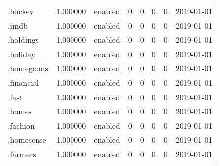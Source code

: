 \begin{tabular}{lrlrrrrl}
.hockey                   &          1.000000 &         enabled &                           0 &                           0 &                           0 &                   0 &           2019-01-01 \\
.imdb                     &          1.000000 &         enabled &                           0 &                           0 &                           0 &                   0 &           2019-01-01 \\
.holdings                 &          1.000000 &         enabled &                           0 &                           0 &                           0 &                   0 &           2019-01-01 \\
.holiday                  &          1.000000 &         enabled &                           0 &                           0 &                           0 &                   0 &           2019-01-01 \\
.homegoods                &          1.000000 &         enabled &                           0 &                           0 &                           0 &                   0 &           2019-01-01 \\
.financial                &          1.000000 &         enabled &                           0 &                           0 &                           0 &                   0 &           2019-01-01 \\
.fast                     &          1.000000 &         enabled &                           0 &                           0 &                           0 &                   0 &           2019-01-01 \\
.homes                    &          1.000000 &         enabled &                           0 &                           0 &                           0 &                   0 &           2019-01-01 \\
.fashion                  &          1.000000 &         enabled &                           0 &                           0 &                           0 &                   0 &           2019-01-01 \\
.homesense                &          1.000000 &         enabled &                           0 &                           0 &                           0 &                   0 &           2019-01-01 \\
.farmers                  &          1.000000 &         enabled &                           0 &                           0 &                           0 &                   0 &           2019-01-01 \\

\end{tabular}
